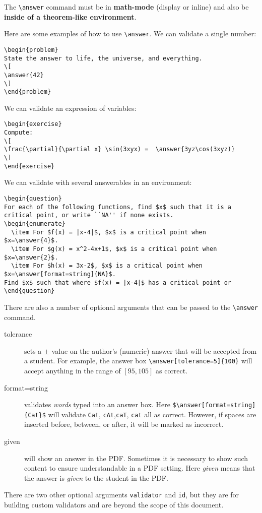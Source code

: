 \documentclass{ximera}
\begin{document}
\begin{warning}
  The \verb|\answer| command must be in \textbf{math-mode} (display or inline)
  and also be \textbf{inside of a
    theorem-like environment}.
\end{warning}
Here are some examples of how to use \verb!\answer!. We can validate a single
number:
\begin{verbatim}
\begin{problem}
State the answer to life, the universe, and everything.
\[
\answer{42}
\]
\end{problem}
\end{verbatim}
We can validate an expression of variables:
\begin{verbatim}
\begin{exercise}
Compute:
\[
\frac{\partial}{\partial x} \sin(3xyx) =  \answer{3yz\cos(3xyz)}
\]
\end{exercise}
\end{verbatim}
We can validate with several answerables in an environment:
\begin{verbatim}
\begin{question}
For each of the following functions, find $x$ such that it is a critical point, or write ``NA'' if none exists.
\begin{enumerate}
  \item For $f(x) = |x-4|$, $x$ is a critical point when $x=\answer{4}$.
  \item For $g(x) = x^2-4x+1$, $x$ is a critical point when $x=\answer{2}$.
  \item For $h(x) = 3x-2$, $x$ is a critical point when $x=\answer[format=string]{NA}$.
Find $x$ such that where $f(x) = |x-4|$ has a critical point or
\end{question}
\end{verbatim}

There are also a number of optional arguments that can be passed
to the \verb|\answer| command.
\begin{description}
  \item[tolerance] sets a $\pm$ value on the
    author's (numeric) answer that will be accepted from a student. For
    example,
    the answer box \verb|\answer[tolerance=5]{100}| will accept anything in
    the range of $[95,105]$ as correct.
  \item[format=string] validates \textit{words} typed into an
    answer box. Here \verb|$\answer[format=string]{Cat}$| will validate
    \verb!Cat!,
    \verb!cAt!,\verb!caT!, \verb!cat! all as
    correct. However, if spaces are inserted before, between, or after, it will
    be marked as incorrect.
  \item[given] will show an answer in the PDF. Sometimes it is necessary to
    show such content to ensure
    understandable in a PDF setting. Here \textit{given} means
    that the answer is \textit{given} to the student in the PDF.
\end{description}
There are two other optional arguments \verb!validator! and \verb!id!, but they
are for building custom validators and are beyond the scope of this document.
\end{document}
